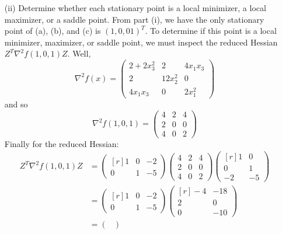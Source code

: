 \documentclass{article}
\begin{document}
\begin{itemize}
    \item[(ii)] Determine whether each stationary point is a local minimizer, a local maximizer, or a saddle point.
    \newline\newline
    From part (i), we have the only stationary point of (a), (b), and (c) is $(1,0,01)^T$. To determine if this point is a local minimizer, maximizer, or saddle point, we must inspect the reduced Hessian $Z^T\nabla^2f(1,0,1)Z$. Well, 
    \[\nabla^2f(x) = \begin{pmatrix}
        2 + 2x_3^2 & 2 & 4x_1x_3\\
        2 & 12x_2^2 & 0\\
        4x_1x_3 & 0 & 2x_1^2
    \end{pmatrix}\]
    and so
    \[\nabla^2f(1,0,1) = \begin{pmatrix}
        4 & 2 & 4\\
        2 & 0 & 0\\
        4 & 0 & 2
    \end{pmatrix}\]
    Finally for the reduced Hessian:
    \begin{align*}
        Z^T\nabla^2f(1,0,1)Z &= \begin{pmatrix*}[r]
            1 & 0 & -2\\
            0 & 1 & -5
        \end{pmatrix*}
        \begin{pmatrix}
            4 & 2 & 4\\
            2 & 0 & 0\\
            4 & 0 & 2
        \end{pmatrix}
        \begin{pmatrix*}[r]
            1 & 0\\
            0 & 1\\
            -2 & -5
        \end{pmatrix*}
        \\
        &= \begin{pmatrix*}[r]
            1 & 0 & -2\\
            0 & 1 & -5
        \end{pmatrix*}
        \begin{pmatrix*}[r]
            -4 & -18\\
            2 & 0\\
            0 & -10
        \end{pmatrix*}
        \\
        &= \begin{pmatrix*}

\end{pmatrix*}
\end{align*}
\end{itemize}
\end{document}
